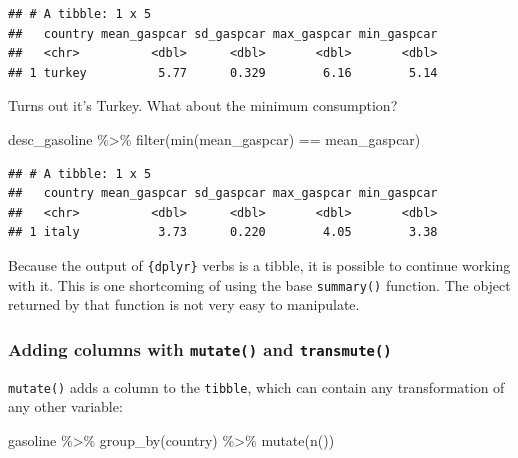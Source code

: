 \documentclass[
]{article}
\newenvironment{Shaded}{\begin{snugshade}}{\end{snugshade}}
\newcommand{\FunctionTok}[1]{\textcolor[rgb]{0.00,0.00,0.00}{#1}}
\newcommand{\NormalTok}[1]{#1}
\newcommand{\SpecialCharTok}[1]{\textcolor[rgb]{0.00,0.00,0.00}{#1}}
\begin{document}
\begin{verbatim}
## # A tibble: 1 x 5
##   country mean_gaspcar sd_gaspcar max_gaspcar min_gaspcar
##   <chr>          <dbl>      <dbl>       <dbl>       <dbl>
## 1 turkey          5.77      0.329        6.16        5.14
\end{verbatim}

Turns out it's Turkey. What about the minimum consumption?

\begin{Shaded}
\begin{Highlighting}[]
\NormalTok{desc\_gasoline }\SpecialCharTok{\%\textgreater{}\%}
  \FunctionTok{filter}\NormalTok{(}\FunctionTok{min}\NormalTok{(mean\_gaspcar) }\SpecialCharTok{==}\NormalTok{ mean\_gaspcar)}
\end{Highlighting}
\end{Shaded}

\begin{verbatim}
## # A tibble: 1 x 5
##   country mean_gaspcar sd_gaspcar max_gaspcar min_gaspcar
##   <chr>          <dbl>      <dbl>       <dbl>       <dbl>
## 1 italy           3.73      0.220        4.05        3.38
\end{verbatim}

Because the output of \texttt{\{dplyr\}} verbs is a tibble, it is possible to continue working with it. This
is one shortcoming of using the base \texttt{summary()} function. The object returned by that function is
not very easy to manipulate.

\hypertarget{adding-columns-with-mutate-and-transmute}{%
\subsubsection{\texorpdfstring{Adding columns with \texttt{mutate()} and \texttt{transmute()}}{Adding columns with mutate() and transmute()}}\label{adding-columns-with-mutate-and-transmute}}

\texttt{mutate()} adds a column to the \texttt{tibble}, which can contain any transformation of any other
variable:

\begin{Shaded}
\begin{Highlighting}[]
\NormalTok{gasoline }\SpecialCharTok{\%\textgreater{}\%}
  \FunctionTok{group\_by}\NormalTok{(country) }\SpecialCharTok{\%\textgreater{}\%}
  \FunctionTok{mutate}\NormalTok{(}\FunctionTok{n}\NormalTok{())}
\end{Highlighting}
\end{Shaded}
\end{document}
